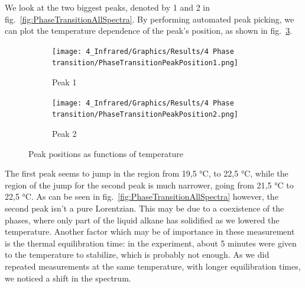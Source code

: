 \documentclass[12pt]{article}
\begin{document}
We look at the two biggest peaks, denoted by 1 and 2 in fig.~\ref{fig:PhaseTransitionAllSpectra}. By performing automated peak picking, we can plot the temperature dependence of the peak's position, as shown in fig.~\ref{fig:PhaseTransitionPeakPositions}.

\begin{figure}[!ht]
    \begin{subfigure}[c]{0.5\textwidth}
        \centering
        \texttt{[image: 4\_Infrared/Graphics/Results/4 Phase transition/PhaseTransitionPeakPosition1.png]}
        \caption{Peak 1}
        \label{fig:PhaseTransitionPeakPosition1}
    \end{subfigure}
    \begin{subfigure}[c]{0.5\textwidth}
        \centering
        \texttt{[image: 4\_Infrared/Graphics/Results/4 Phase transition/PhaseTransitionPeakPosition2.png]}
        \caption{Peak 2}
        \label{fig:PhaseTransitionPeakPosition2}
    \end{subfigure}
    \caption{Peak positions as functions of temperature}
    \label{fig:PhaseTransitionPeakPositions}
\end{figure}
\FloatBarrier

The first peak seems to jump in the region from 19,5 \si{\celsius}, to 22,5 \si{\celsius}, while the region of the jump for the second peak is much narrower, going from 21,5 \si{\celsius} to 22,5 \si{\celsius}. As can be seen in fig.~\ref{fig:PhaseTransitionAllSpectra} however, the second peak isn't a pure Lorentzian. This may be due to a coexistence of the phases, where only part of the liquid alkane has solidified as we lowered the temperature. Another factor which may be of importance in these measurement is the thermal equilibration time: in the experiment, about 5 minutes were given to the temperature to stabilize, which is probably not enough. As we did repeated measurements at the same temperature, with longer equilibration times, we noticed a shift in the spectrum.
\end{document}
